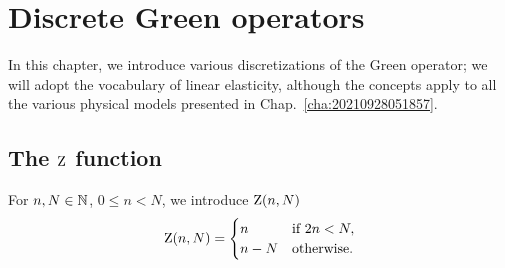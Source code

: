 \chapter{Discrete Green operators}

In this chapter, we introduce various discretizations of the Green operator; we
will adopt the vocabulary of linear elasticity, although the concepts apply to
all the various physical models presented in Chap.~\ref{cha:20210928051857}.

\section{The \(\operatorname{Z}\) function}

For \(n, N\in\mathbb N\), \(0\leq n<N\), we introduce \(\operatorname{Z}(n, N)\)
\begin{equation}
  \operatorname{Z}(n, N)=
  \begin{cases}
    n & \text{if }2n<N,\\
    n-N & \text{otherwise.}
  \end{cases}
\end{equation}

